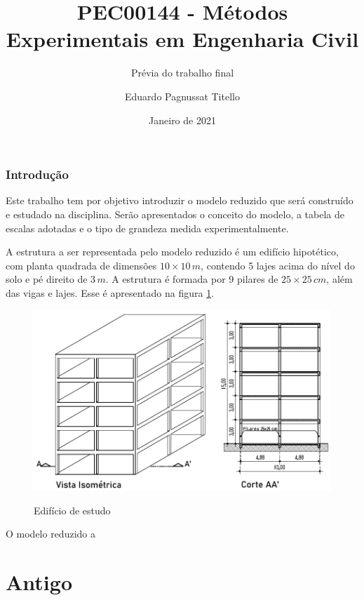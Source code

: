 

\author{Eduardo Pagnussat Titello}
\title{PEC00144 - Métodos Experimentais em Engenharia Civil}
\subtitle{Prévia do trabalho final}
\date{Janeiro de 2021}




\maketitle

\section{Introdução}
Este trabalho tem por objetivo introduzir o modelo reduzido que será construído e estudado na disciplina. Serão apresentados o conceito do modelo, a tabela de escalas adotadas e o tipo de grandeza medida experimentalmente.


A estrutura a ser representada pelo modelo reduzido é um edifício hipotético, com planta quadrada de dimensões $10 \times 10 \, m$, contendo 5 lajes acima do nível do solo e pé direito de $3 \, m$. A estrutura é formada por 9 pilares de $25 \times 25 \, cm$,  além das vigas e lajes. Esse é apresentado na figura \ref{fig:edfestudo}.


\begin{figure}
	\centering
	\caption{Edifício de estudo}
	\includegraphics[scale=0.9]{../Images/VistaeCorte}
	\label{fig:edfestudo}
\end{figure}


O modelo reduzido a








\pagebreak \part{Antigo}


